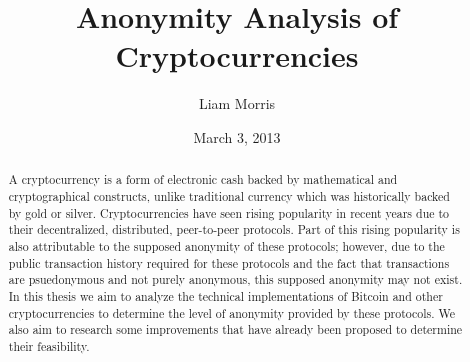 \documentclass[11pt]{article}
\begin{document}
\begin{titlepage}
\title{Anonymity Analysis of Cryptocurrencies}
\author{Liam Morris \\
  }
\date{March 3, 2013}
\end{titlepage}
\maketitle
\vfill
\begin{abstract}
A cryptocurrency is a form of electronic cash backed by mathematical and
cryptographical constructs, unlike traditional currency which was historically
backed by gold or silver. Cryptocurrencies have seen rising popularity in recent
years due to their decentralized, distributed, peer-to-peer protocols. Part of
this rising popularity is also attributable to the supposed anonymity of these
protocols; however, due to the public transaction history required for these
protocols and the fact that transactions are psuedonymous and not purely
anonymous, this supposed anonymity may not exist. In this thesis we aim to
analyze the technical implementations of Bitcoin and other cryptocurrencies to
determine the level of anonymity provided by these protocols. We also aim to
research some improvements that have already been proposed to determine their
feasibility.
\end{abstract}
\thispagestyle{empty}
\clearpage
{}
\tableofcontents
\listoffigures
\pagebreak
\end{document}
